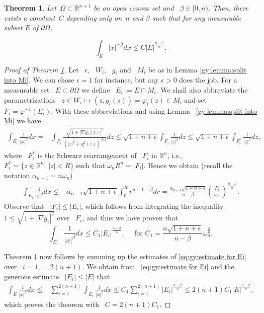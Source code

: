 \documentclass[10pt,a4paper]{amsart}
\newtheorem{theorem}{Theorem}
\newcommand{\R}{\mathbb{R}}
\newcommand{\delomega}{\partial\Omega}
\renewcommand{\leq}{\leqslant}
\begin{document}
\begin{theorem}
    \label{th:intro:key theorem}
     Let~$\Omega\subset\R^{n+1}$ be an open convex set and ~$\beta \in [0,n)$. Then, there exists a constant~$C$ depending only on~$n$ and $\beta$  such that for any measurable subset $E$ of $\delomega$,

     \begin{equation}
         \label{eq:intro: main estimate}
\int_{E}|x|^{-\beta}dx \leq C |E|^{\frac{n-\beta}{n}}.
     \end{equation}
\end{theorem}

\begin{proof}[Proof of Theorem \ref{th:intro:key theorem}]
Let ~$\epsilon$, ~$W_i$, ~$g_i$ and ~$M_i$ be as in Lemma \ref{gy:lemma:split into Mi}. We can chose $\epsilon=1$ for instance, but any $\epsilon>0$ does the job. For a measurable set ~$E\subset \partial\Omega$ we define ~$E_i:=E\cap M_i$. We shall also abbreviate the parametrizations ~$z\in W_i\mapsto(z,g_i(z))=\varphi_i(z)\in M_i$ and set ~$F_i=\varphi^{-1}(E_i)$. With these abbreviations and using Lemma ~\ref{gy:lemma:split into Mi} we have 
\begin{align*}
    \int_{E_i}\frac{1}{|x|^{\beta}}dx
    =&
    \int_{F_i}\frac{\sqrt{1+|\nabla g_i(z)|^2}}{(|z|^2+g_i^2(z))^{\beta/2}}dz
    \leq
    \sqrt{1+n+\epsilon}\int_{F_i}\frac{1}{|z|^{\beta}}dz
    \leq
    \sqrt{1+n+\epsilon}\int_{F_i^*}\frac{1}{|z|^{\beta}}dz,
\end{align*}
where ~$F_i^*$ is the Schwarz rearrangement of ~$F_i$ in $\R^n$, i.e., ~$F_i^*=\{z\in\R^n:\,|z|<R\}$ such that $\omega_n R^n=|F_i|$. Hence we obtain (recall the notation $\alpha_{n-1}=n\omega_n$)
\begin{align*}
        \int_{E_i}\frac{1}{|x|^{\beta}}dx
    \leq & \alpha_{n-1}\sqrt{1+n+\epsilon}\int_0^{R}r^{n-1-\beta}dr
    =\frac{\alpha_{n-1}\sqrt{1+n+\epsilon}}{n-\beta}\left(\frac{|F_i|}{\omega_n}\right)^{\frac{n-\beta}{n}}.
\end{align*}
Observe that ~$|F_i|\leq |E_i|$, which follows from integrating the inequality ~$1\leq \sqrt{1+|\nabla g_i|^2}$ over ~$F_i$, and thus we have proven that 
\begin{equation}
 \label{eq:gy:estimate for Ei}
   \int_{E_i}\frac{1}{|x|^{\beta}}dx\leq C_1 |E_i|^{\frac{n-\beta}{n}},\quad
   \text{ for }C_1=\frac{n\sqrt{1+n+\epsilon}}{n-\beta} \omega_n^{\frac{\beta}{n}}.
\end{equation}

Theorem \ref{th:intro:key theorem}  now follows by summing up the estimates of \eqref{eq:gy:estimate for Ei} over ~$i=1,\ldots, 2(n+1)$. We obtain from ~\eqref{eq:gy:estimate for Ei} and the generous estimate ~$|E_i|\leq |E|$ that 
\begin{align*}
    \int_{E}\frac{1}{|x|^{\beta}}dx\leq & \sum_{i=1}^{2(n+1)}\int_{E_i}\frac{1}{|x|^{\beta}}dx\leq C_1\sum_{i=1}^{2(n+1)}|E_i|^{\frac{n-\beta}{n}}
    \leq 
    2(n+1)C_1 |E|^{\frac{n-\beta}{n}},
\end{align*}
which proves the theorem with 
~$
  C=2(n+1)C_1
$.
\end{proof}
\end{document}
